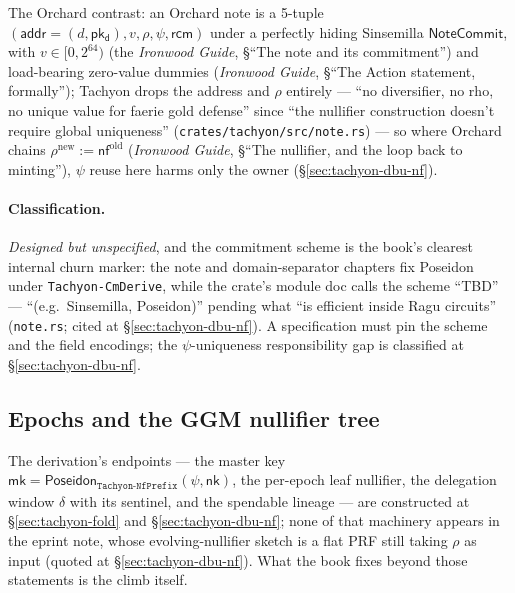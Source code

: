 \documentclass[11pt,a4paper]{article}
\theoremstyle{definition}
\newcommand{\nfsym}{\mathsf{nf}}
\newcommand{\NoteCommit}{\ensuremath{\mathsf{NoteCommit}}}
\newcommand{\nksym}{\ensuremath{\mathsf{nk}}}
\newcommand{\pkd}{\ensuremath{\mathsf{pk_d}}}
\newcommand{\rcm}{\ensuremath{\mathsf{rcm}}}
\begin{document}
The Orchard contrast: an Orchard note is a 5-tuple
$(\mathsf{addr} = (d, \pkd), v, \rho, \psi, \rcm)$ under a perfectly
hiding Sinsemilla $\NoteCommit$, with $v \in [0, 2^{64})$ (the
\emph{Ironwood Guide}, \S``The note and its commitment'') and load-bearing
zero-value dummies (\emph{Ironwood Guide},
\S``The Action statement, formally''); Tachyon drops the address and
$\rho$ entirely --- ``no diversifier, no rho, no unique value for faerie
gold defense'' since ``the nullifier construction doesn't require global
uniqueness'' (\texttt{crates/tachyon/src/note.rs}) --- so where Orchard
chains $\rho^{\mathrm{new}} := \nfsym^{\mathrm{old}}$ (\emph{Ironwood
Guide}, \S``The nullifier, and the loop back to minting''), $\psi$ reuse
here harms only the owner (\S\ref{sec:tachyon-dbu-nf}).

\paragraph{Classification.} \emph{Designed but unspecified}, and the
commitment scheme is the book's clearest internal churn marker: the note
and domain-separator chapters fix Poseidon under \texttt{Tachyon-CmDerive},
while the crate's module doc calls the scheme ``TBD'' --- ``(e.g.\
Sinsemilla, Poseidon)'' pending what ``is efficient inside Ragu circuits''
(\texttt{note.rs}; cited at \S\ref{sec:tachyon-dbu-nf}). A specification
must pin the scheme and the field encodings; the $\psi$-uniqueness
responsibility gap is classified at \S\ref{sec:tachyon-dbu-nf}.

\subsection{Epochs and the GGM nullifier tree}\label{sec:tachyon-design-ggm}

The derivation's endpoints --- the master key
$\mathsf{mk} = \mathsf{Poseidon}_{\texttt{Tachyon-NfPrefix}}(\psi, \nksym)$,
the per-epoch leaf nullifier, the delegation window $\delta$ with its
sentinel, and the spendable lineage --- are constructed at
\S\ref{sec:tachyon-fold} and \S\ref{sec:tachyon-dbu-nf}; none of that
machinery appears in the eprint note, whose evolving-nullifier sketch is a
flat PRF still taking $\rho$ as input (quoted at
\S\ref{sec:tachyon-dbu-nf}).
What the book fixes beyond those statements is the climb itself.
\end{document}
